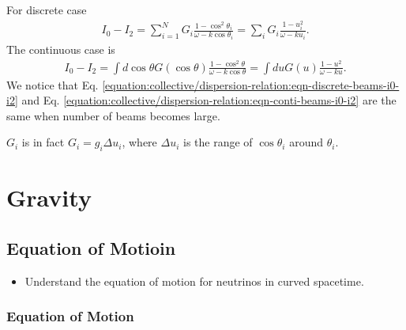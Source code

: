 \documentclass[letterpaper,12pt,english]{sphinxmanual}
\begin{document}
For discrete case
\label{\detokenize{collective/dispersion-relation:equation-eqn-discrete-beams-i0-i2}}\begin{equation}\label{equation:collective/dispersion-relation:eqn-discrete-beams-i0-i2}
\begin{split}I_0 - I_2 = \sum_{i=1}^N G_i \frac{ 1-\cos^2\theta_i }{\omega - k \cos \theta_i} = \sum_i G_i \frac{1-u_i^2}{\omega-k u_i}.\end{split}
\end{equation}
The continuous case is
\label{\detokenize{collective/dispersion-relation:equation-eqn-conti-beams-i0-i2}}\begin{equation}\label{equation:collective/dispersion-relation:eqn-conti-beams-i0-i2}
\begin{split}I_0 - I_2 = \int d\cos\theta  G(\cos\theta) \frac{1 - \cos^2\theta}{\omega- k \cos\theta} = \int du G(u) \frac{1-u^2}{\omega-k u} .\end{split}
\end{equation}
We notice that Eq. \eqref{equation:collective/dispersion-relation:eqn-discrete-beams-i0-i2} and Eq. \eqref{equation:collective/dispersion-relation:eqn-conti-beams-i0-i2} are the same when number of beams becomes large.

\(G_i\) is in fact \(G_i = g_i \Delta u_i\), where \(\Delta u_i\) is the range of \(\cos \theta_i\) around \(\theta_i\).


\chapter{Gravity}
\label{\detokenize{gravity/index::doc}}\label{\detokenize{gravity/index:gravity}}

\section{Equation of Motioin}
\label{\detokenize{gravity/equation-of-motion:equation-of-motioin}}\label{\detokenize{gravity/equation-of-motion::doc}}\begin{itemize}
\item {} 
Understand the equation of motion for neutrinos in curved spacetime.

\end{itemize}


\subsection{Equation of Motion}
\label{\detokenize{gravity/equation-of-motion:equation-of-motion}}
\end{document}

